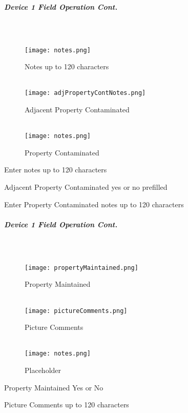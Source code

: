 \documentclass[class=article , crop=false, titlepage, twoside, multi={itemize, figure, verbatim}, float=false]{standalone}
\begin{document}
\clearpage
\subparagraph*{Device 1 Field Operation Cont.}
\subparagraph*{\\}
\begin{wrapfigure}{r}{0.5\textwidth}
\centering
\texttt{[image: notes.png]}
\caption {Notes up to 120 characters}
\vspace{.2in}
\HRule \\[.4cm] %
\vspace{.2in}
\texttt{[image: adjPropertyContNotes.png]}
\caption{Adjacent Property Contaminated}
\vspace{.2in}
\HRule \\[.4cm] %
\vspace{.2in}
\texttt{[image: notes.png]}
\caption{Property Contaminated}
\end{wrapfigure}
Enter notes up to 120 characters\\
\vspace{2in}

\noindent Adjacent Property Contaminated yes or no prefilled\\
\vspace{2in}

\noindent Enter Property Contaminated notes up to 120 characters\\

\clearpage
\subparagraph*{Device 1 Field Operation Cont.}
\subparagraph*{\\}
\begin{wrapfigure}{r}{0.5\textwidth}
\centering
\texttt{[image: propertyMaintained.png]}
\caption {Property Maintained}
\vspace{.15in}
\HRule \\[.4cm] %
\vspace{.2in}
\texttt{[image: pictureComments.png]}
\caption{Picture Comments}
\vspace{.15in}
\HRule \\[.4cm] %
\vspace{.2in}
\texttt{[image: notes.png]}
\caption{Placeholder}
\end{wrapfigure}
Property Maintained Yes or No\\
\vspace{2in}

\noindent Picture Comments up to 120 characters\\
\vspace{2in}
\end{document}
